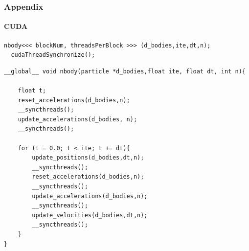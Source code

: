 \begin{frame}[fragile]
\frametitle{Appendix}
\framesubtitle{CUDA}

\begin{lstlisting}[style=C]
  nbody<<< blockNum, threadsPerBlock >>> (d_bodies,ite,dt,n);
  cudaThreadSynchronize();
\end{lstlisting}

\begin{lstlisting}[style=C]
__global__ void nbody(particle *d_bodies,float ite, float dt, int n){

    float t;
    reset_accelerations(d_bodies,n);
    __syncthreads();
    update_accelerations(d_bodies, n);
    __syncthreads();

    for (t = 0.0; t < ite; t += dt){
        update_positions(d_bodies,dt,n);
        __syncthreads();
        reset_accelerations(d_bodies,n);
        __syncthreads();
        update_accelerations(d_bodies,n);
        __syncthreads();
        update_velocities(d_bodies,dt,n);
        __syncthreads();
    }
}
\end{lstlisting}
\end{frame}
